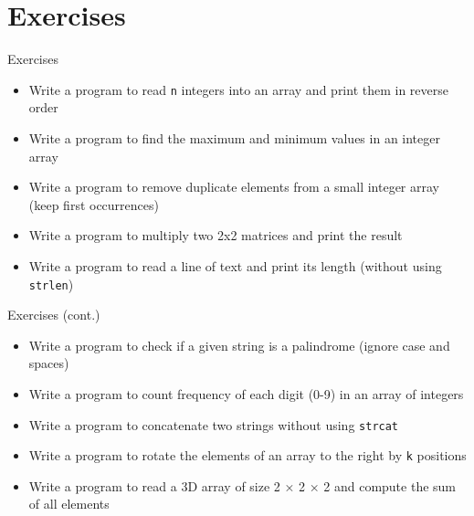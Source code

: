 \documentclass[12pt, aspectratio=169]{beamer}
\begin{document}
    \section{Exercises}


    \begin{frame}{Exercises}
        \begin{itemize}
            \item Write a program to read \texttt{n} integers into an array and print them in reverse order
            \item Write a program to find the maximum and minimum values in an integer array
            \item Write a program to remove duplicate elements from a small integer array (keep first occurrences)
            \item Write a program to multiply two 2x2 matrices and print the result
            \item Write a program to read a line of text and print its length (without using \texttt{strlen})
        \end{itemize}
    \end{frame}


    \begin{frame}{Exercises (cont.)}
        \begin{itemize}
            \item Write a program to check if a given string is a palindrome (ignore case and spaces)
            \item Write a program to count frequency of each digit (0-9) in an array of integers
            \item Write a program to concatenate two strings without using \texttt{strcat}
            \item Write a program to rotate the elements of an array to the right by \texttt{k} positions
            \item Write a program to read a 3D array of size 2 × 2 × 2 and compute the sum of all elements
        \end{itemize}
    \end{frame}
\end{document}
